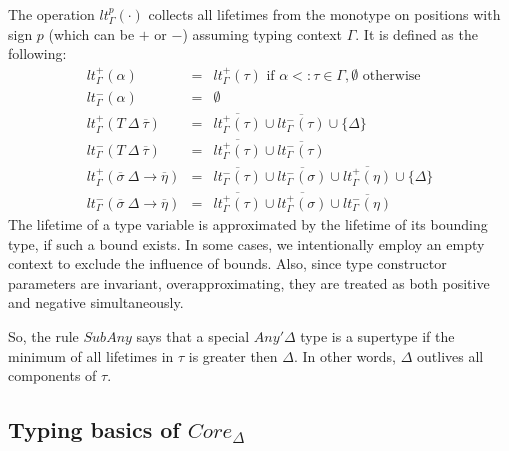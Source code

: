 \documentclass[11pt]{article}
\newcommand{\ap}{~}
\begin{document}
    The operation $lt_\Gamma^p(\cdot)$ collects all lifetimes from the monotype on positions with sign $p$ (which can be $+$ or $-$) assuming typing context $\Gamma$.
    It is defined as the following:
    \[
        \begin{array}{lll}
            lt_\Gamma^+(\alpha)                                       & = & lt_\Gamma^+(\tau) \text{ if } \alpha <: \tau \in \Gamma, \emptyset \text{ otherwise}                                     \\
            lt_\Gamma^-(\alpha)                                       & = & \emptyset \\ %
            lt_\Gamma^+(T\ap\Delta\ap\overline{\tau})                 & = & \overline{lt_\Gamma^+(\tau)} \cup \overline{lt_\Gamma^-(\tau)} \cup \{\Delta\}                                           \\
            lt_\Gamma^-(T\ap\Delta\ap\overline{\tau})                 & = & \overline{lt_\Gamma^+(\tau)} \cup \overline{lt_\Gamma^-(\tau)}                                                           \\
            lt_\Gamma^{+}(\overline{\sigma}~\Delta\to\overline{\eta}) & = & \overline{lt_\Gamma^{-}(\tau)} \cup \overline{lt_\Gamma^{-}(\sigma)} \cup \overline{lt_\Gamma^{+}(\eta)} \cup \{\Delta\} \\
            lt_\Gamma^{-}(\overline{\sigma}~\Delta\to\overline{\eta}) & = & \overline{lt_\Gamma^{+}(\tau)} \cup \overline{lt_\Gamma^{+}(\sigma)} \cup \overline{lt_\Gamma^{-}(\eta)}
        \end{array}
    \]
    The lifetime of a type variable is approximated by the lifetime of its bounding type, if such a bound exists.
    In some cases, we intentionally employ an empty context to exclude the influence of bounds.
    Also, since type constructor parameters are invariant, overapproximating, they are treated as both positive and negative simultaneously. %

    So, the rule $SubAny$ says that a special $Any'\Delta$ type is a supertype if the minimum of all lifetimes in $\tau$ is greater then $\Delta$.
    In other words, $\Delta$ outlives all components of $\tau$.

    \subsection{Typing basics of $Core_\Delta$}
\end{document}
